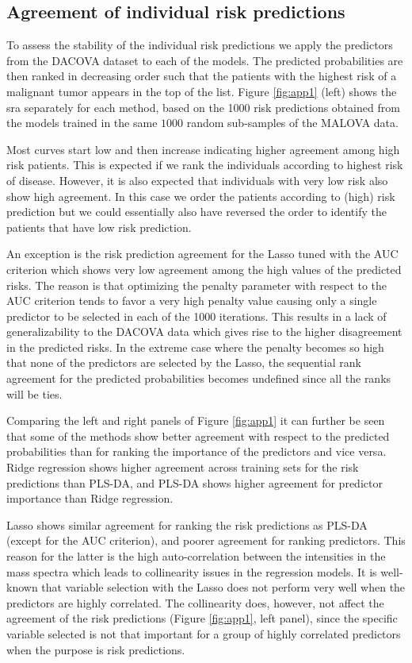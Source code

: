 \documentclass[oupdraft]{bio}
\begin{document}
\subsection{Agreement of individual risk predictions}
\label{sec:airp}
To assess the stability of the individual risk predictions we apply
the predictors from the DACOVA dataset to each of the models. The
predicted probabilities are then ranked in decreasing order such that
the patients with the highest risk of a malignant tumor appears in the
top of the list. Figure \ref{fig:app1} (left) shows the sra separately
for each method, based on the 1000 risk predictions obtained from the
models trained in the same $1000$ random sub-samples of the MALOVA
data.

Most curves start low and then increase indicating higher agreement
among high risk patients. This is expected if we rank the individuals
according to highest risk of disease. However, it is also expected
that individuals with very low risk also show high agreement. In this
case we order the patients according to (high) risk prediction but we
could essentially also have reversed the order to identify the
patients that have low risk prediction.

An exception is the risk prediction agreement for the Lasso tuned with the AUC criterion which
shows very low agreement among the high values of the predicted
risks. The reason is that optimizing the penalty parameter with
respect to the AUC criterion tends to favor a very high penalty value
causing only a single predictor to be selected in each of the 1000
iterations. This results in a lack of generalizability to the DACOVA
data which gives rise to the higher disagreement in the predicted risks.
In the extreme case where the penalty becomes so high
that none of the predictors are selected by the Lasso, the sequential
rank agreement for the predicted probabilities becomes undefined since
all the ranks will be ties.


Comparing the left and right panels of Figure \ref{fig:app1} it can
further be seen that some of the methods show better agreement with
respect to the predicted probabilities than for ranking the importance
of the predictors and vice versa. Ridge regression shows higher agreement across training
sets for the risk predictions than PLS-DA, and PLS-DA shows higher
agreement for predictor importance than Ridge regression.

Lasso shows similar agreement for ranking the risk predictions as
PLS-DA (except for the AUC criterion), and poorer agreement for
ranking predictors. This reason for the latter is the high
auto-correlation between the intensities in the mass spectra which
leads to collinearity issues in the regression models. It is
well-known that variable selection with the Lasso does not
perform very well when the predictors are highly correlated. The
collinearity does, however, not affect the agreement of the risk
predictions (Figure \ref{fig:app1}, left panel), since
the specific variable selected is not that important for 
a group of highly correlated predictors when the purpose is risk
predictions.
\end{document}
